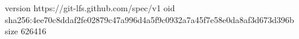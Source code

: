 version https://git-lfs.github.com/spec/v1
oid sha256:4ee70c8ddaf2fe02879c47a996d4a5f9c0932a7a45f7e58e0da8af3d673d396b
size 626416
